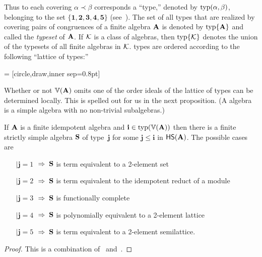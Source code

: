Thus to each covering $\alpha \prec \beta$
corresponds a ``\tct type,'' denoted by $\operatorname{typ}(\alpha, \beta)$,
belonging to the set 
$\{\mathbf{1},\mathbf{2},\mathbf{3},\mathbf{4},\mathbf{5}\}$ 
(see~\cite[Def.~5.1]{HM:1988}).
The set of all \tct types that are realized by covering pairs of congruences of a
finite algebra $\mathbf{A}$ is denoted by $\operatorname{typ}\{\mathbf{A}\}$ 
and called the \emph{typeset} of $\mathbf{A}$.
If $\mathcal{K}$ is a class of algebras, then $\operatorname{typ}\{\mathcal{K}\}$ denotes the union of the typesets of all finite algebras in $\mathcal{K}$.
\tct types are ordered according to the following ``lattice of types:''

\newcommand{\dotsize}{0.8pt}
 = [circle,draw,inner sep=\dotsize]
\begin{center}
\newcommand{\figscale}{.7}
\end{center}
Whether or not $\operatorname{\mathbb{V}}(\mathbf{A})$ omits one of the order ideals of the lattice of types can be
determined locally.  This is spelled out for us in the next proposition.
(A  algebra is a simple
algebra with no non-trivial subalgebras.)


\begin{prop}
  \label{prop:2.1}
If $\mathbf{A}$ is a finite idempotent algebra and 
$\mathbf{i} \in \operatorname{typ}(\operatorname{\mathbb{V}}(\mathbf{A}))$ then there
is a finite strictly simple algebra $\mathbf{S}$ of 
type~$\mathbf{j}$ for 
some $\mathbf{j} \leq \mathbf{i}$ in $\mathsf{H} \mathsf{S} (\mathbf{A})$.
The possible cases are
\begin{itemize}
\item[$\mid \mathbf{j} = 1$] $\;\Rightarrow \;\mathbf{S}$ is term equivalent to a 2-element set
\item[$\mid \mathbf{j} = 2$] $\;\Rightarrow \;\mathbf{S}$ is term equivalent to the idempotent reduct of a module
\item[$\mid \mathbf{j} = 3$] $\;\Rightarrow \;\mathbf{S}$ is functionally complete
\item[$\mid \mathbf{j} = 4$] $\;\Rightarrow \;\mathbf{S}$ is polynomially equivalent to a 2-element lattice
\item[$\mid \mathbf{j} = 5$] $\;\Rightarrow \;\mathbf{S}$ is term equivalent to a 2-element semilattice.
\end{itemize} %
\end{prop}
\begin{proof}
  This is a combination of~\cite[Proposition~3.1]{MR2504025} and~\cite[Theorem~6.1]{MR1191235}.
\end{proof}

